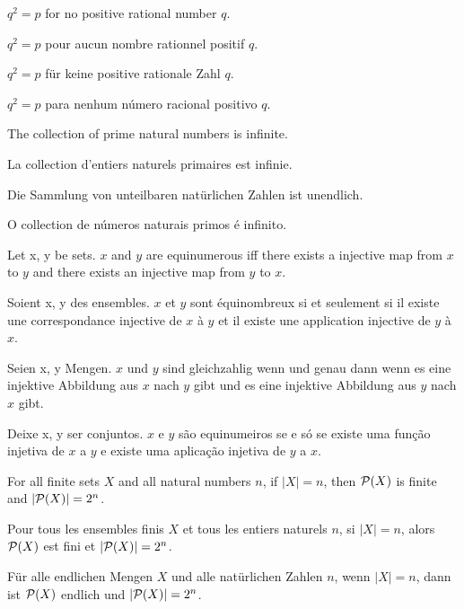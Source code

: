 \documentclass{article}
\begin{document}
\setlength\parindent{0pt}

\newcommand{\Prod}[3]{#1_{#2} \cdots #1_{#3}}
\newcommand{\Seq}[2]{\{#1,\dots,#2\}}
\newcommand{\FinSet}[3]{\{#1_{#2},\dots,#1_{#3}\}}
\newcommand{\Primes}{\mathbb{P}}
\newcommand{\pow}{{\cal P}}
\newcommand{\range}{\operatorname{ran}}
\newcommand{\inv}[1]{#1^{-1}}
\newcommand{\sset}[2]{\{#1\}_{#2}}
\newcommand{\sumgeom}[2]{\sum_{0 \leq i < #2} {#1}^i}
\newcommand{\sumarith}[3]{\sum_{i = 1}^{#3}(#1 + #2 \cdot i)}

$ q^{2} = p $ for no positive rational number $ q $.

$ q^{2} = p $ pour aucun nombre rationnel positif $ q $.

$ q^{2} = p $ für keine positive rationale Zahl $ q $.

$ q^{2} = p $ para nenhum número racional positivo $ q $.


The collection of prime natural numbers is infinite.

La collection d'entiers naturels primaires est infinie.

Die Sammlung von unteilbaren natürlichen Zahlen ist unendlich.

O collection de números naturais primos é infinito.


Let x, y be sets. $ x $ and $ y $ are equinumerous iff there exists a injective map from $ x $ to $ y $ and there exists an injective map from $ y $ to $ x $.

Soient x, y des ensembles. $ x $ et $ y $ sont équinombreux si et seulement si il existe une correspondance injective de $ x $ à $ y $ et il existe une application injective de $ y $ à $ x $.

Seien x, y Mengen. $ x $ und $ y $ sind gleichzahlig wenn und genau dann wenn es eine injektive Abbildung aus $ x $ nach $ y $ gibt und es eine injektive Abbildung aus $ y $ nach $ x $ gibt.

Deixe x, y ser conjuntos. $ x $ e $ y $ são equinumeiros se e só se existe uma função injetiva de $ x $ a $ y $ e existe uma aplicação injetiva de $ y $ a $ x $.


For all finite sets $ X $ and all natural numbers $ n $, if $ |X| = n $, then $ \pow(X) $ is finite and $ |\pow(X)| = 2^{n} $.

Pour tous les ensembles finis $ X $ et tous les entiers naturels $ n $, si $ |X| = n $, alors $ \pow(X) $ est fini et $ |\pow(X)| = 2^{n} $.

Für alle endlichen Mengen $ X $ und alle natürlichen Zahlen $ n $, wenn $ |X| = n $, dann ist $ \pow(X) $ endlich und $ |\pow(X)| = 2^{n} $.
\end{document}
